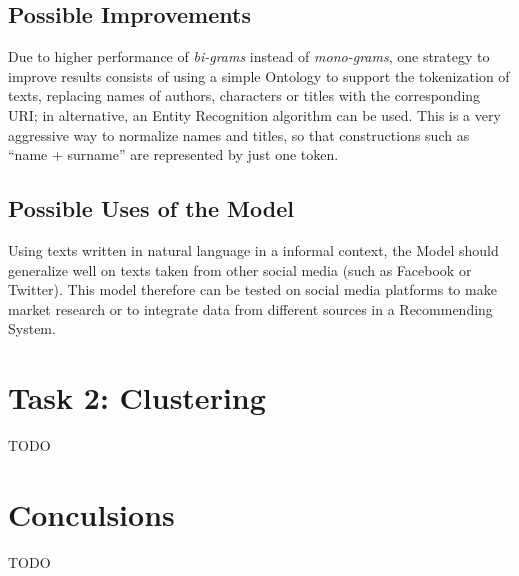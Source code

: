 \documentclass[fleqn,10pt]{SelfArx}
\begin{document}
\subsection{Possible Improvements}
Due to higher performance of \textit{bi-grams} instead of \textit{mono-grams}, one strategy to improve results consists of using a simple Ontology to support the tokenization of texts, replacing names of authors, characters or titles with the corresponding URI; in alternative, an Entity Recognition algorithm can be used.
This is a very aggressive way to normalize names and titles, so that constructions such as ``name + surname'' are represented by just one token.

\subsection{Possible Uses of the Model}
Using texts written in natural language in a informal context, the Model should generalize well on texts taken from other social media (such as Facebook or Twitter).
This model therefore can be tested on social media platforms to make market research or to integrate data from different sources in a Recommending System.

\newpage
\section{Task 2: Clustering}
TODO
\newpage
\hfill
\newpage
\section{Conculsions}
TODO
\newpage
\printbibliography


\end{document}
